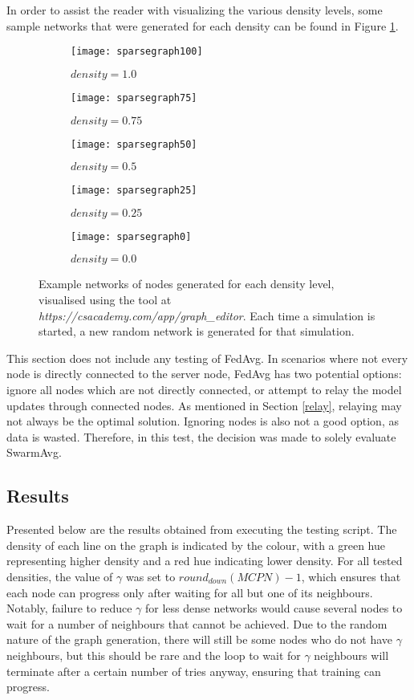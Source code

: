 In order to assist the reader with visualizing the various density levels, some sample networks that were generated for each density can be found in Figure \ref{densefig}.

\begin{figure}[H]
	\centering
	\begin{subfigure}[b]{0.3\textwidth}
		\centering
		\texttt{[image: sparsegraph100]}
		\caption{$density=1.0$}
	\end{subfigure}
	\begin{subfigure}[b]{0.3\textwidth}
		\centering
		\texttt{[image: sparsegraph75]}
		\caption{$density=0.75$}
	\end{subfigure}
	\begin{subfigure}[b]{0.3\textwidth}
		\centering
		\texttt{[image: sparsegraph50]}
		\caption{$density=0.5$}
	\end{subfigure}
	\begin{subfigure}[b]{0.3\textwidth}
		\centering
		\texttt{[image: sparsegraph25]}
		\caption{$density=0.25$}
	\end{subfigure}
	\begin{subfigure}[b]{0.3\textwidth}
		\centering
		\texttt{[image: sparsegraph0]}
		\caption{$density=0.0$}
	\end{subfigure}
	\caption{Example networks of nodes generated for each density level, visualised using the tool at \emph{https://csacademy.com/app/graph\_editor}. Each time a simulation is started, a new random network is generated for that simulation. \label{densefig}}
{}\end{figure}


This section does not include any testing of FedAvg. In scenarios where not every node is directly connected to the server node, FedAvg has two potential options: ignore all nodes which are not directly connected, or attempt to relay the model updates through connected nodes. As mentioned in Section \ref{relay}, relaying may not always be the optimal solution. Ignoring nodes is also not a good option, as data is wasted. Therefore, in this test, the decision was made to solely evaluate SwarmAvg.


\subsection{Results}
Presented below are the results obtained from executing the testing script. The density of each line on the graph is indicated by the colour, with a green hue representing higher density and a red hue indicating lower density. For all tested densities, the value of $\gamma$ was set to $round_{down}(MCPN) - 1$, which ensures that each node can progress only after waiting for all but one of its neighbours. Notably, failure to reduce $\gamma$ for less dense networks would cause several nodes to wait for a number of neighbours that cannot be achieved. Due to the random nature of the graph generation, there will still be some nodes who do not have $\gamma$ neighbours, but this should be rare and the loop to wait for $\gamma$ neighbours will terminate after a certain number of tries anyway, ensuring that training can progress.

